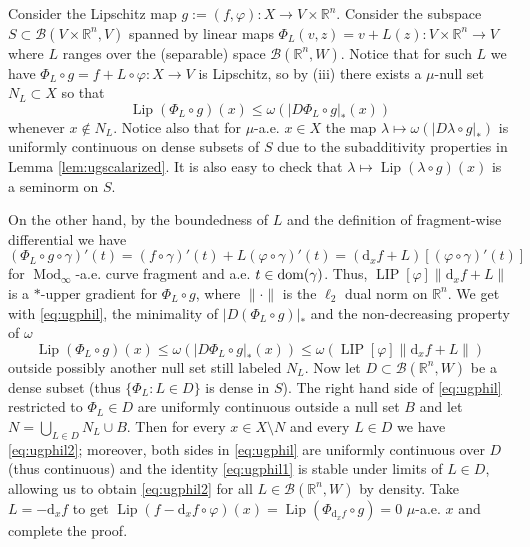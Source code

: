 \documentclass{amsart}
\numberwithin{equation}{section}
\newcommand{\R}{\mathbb{R}}
\newcommand{\Mod}{\operatorname{Mod}}
\newcommand{\Lip}{\operatorname{Lip}}
\newcommand{\LIP}{\operatorname{LIP}}
\newcommand{\ud}{\mathrm {d}}
\begin{document}
Consider the Lipschitz map $g:=(f,\varphi):X\to V\times \R^n$. Consider the subspace $S\subset \mathcal B(V\times \R^n,V)$ spanned by linear maps $\Phi_L(v,z)=v+L(z):V\times \R^n\to V$ where $L$ ranges over the (separable) space $\mathcal B(\R^n,W)$. Notice  that for such $L$ we have $\Phi_L\circ g=f+L\circ\varphi :X\rightarrow V$ is Lipschitz, so by (iii) there exists a $\mu$-null set $N_{L}\subset X$ so that 
\begin{equation}\label{eq:ugphil}
\Lip (\Phi_L\circ g)(x)\le \omega(|D \Phi_L \circ g|_*(x))
\end{equation}
whenever $x\notin N_L$. Notice also that for $\mu$-a.e. $x\in X$ the map $\lambda \mapsto \omega ( |D \lambda \circ g|_*)$ is uniformly continuous on dense subsets of $S$ due to the subadditivity properties in Lemma \ref{lem:ugscalarized}. It is also easy to check that $\lambda\mapsto \Lip (\lambda\circ g)(x) $ is a seminorm on $S$.

On the other hand, by the boundedness of $L$ and the definition of fragment-wise differential we have
\begin{equation}\label{eq:ugphil1}
(\Phi_L \circ g\circ \gamma)'(t)=(f\circ\gamma )'(t)+L(\varphi\circ\gamma )'(t)=(\ud_xf+L)[(\varphi \circ \gamma)'(t)]
\end{equation}
for $\Mod_\infty$-a.e. curve fragment and a.e. $t \in {\rm dom}(\gamma)$. Thus, $\LIP[\varphi]\|\ud_xf+L\|$ is a $\ast$-upper gradient for $\Phi_L\circ g$, where $\|\cdot\|$ is the $\ell_2$ dual norm on $\R^n$. We get with \eqref{eq:ugphil}, the minimality of $|D(\Phi_L\circ g )|_*$ and the non-decreasing property of $\omega$
\begin{equation}\label{eq:ugphil2}
\Lip (\Phi_L\circ g)(x) \leq \omega(|D \Phi_L \circ g|_*(x))\leq \omega(\LIP[\varphi]\|\ud_xf+L\|)
\end{equation}
outside possibly another null set still labeled $N_L$. Now let $D\subset\mathcal B (\R^n,W)$ be a dense subset (thus $\{ \Phi_L:L\in D\}$ is dense in $S$). The right hand side of \eqref{eq:ugphil} restricted to $\Phi_L\in D$ are uniformly continuous outside a null set $B$ and let $N=\bigcup_{L\in D}N_L \cup B$. Then for every $x\in X\setminus N$ and every $L\in D$ we have \eqref{eq:ugphil2}; moreover, both sides in \eqref{eq:ugphil} are uniformly continuous over $D$ (thus continuous) and the identity \eqref{eq:ugphil1} is stable under limits of $L\in D$, allowing us to obtain \eqref{eq:ugphil2} for all $L\in \mathcal B(\R^n,W)$ by density.  Take 
 $L=-\ud_x f$ to get
 $\Lip(f-\ud_xf\circ\varphi)(x)=\Lip(\Phi_{\ud_x f}\circ g)=0$ $\mu$-a.e. $x$ and complete the proof. 
\end{document}
